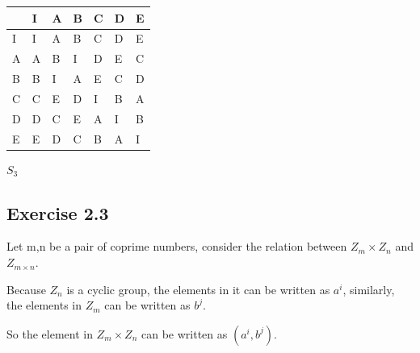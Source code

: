 \documentclass[]{ctexart}
\begin{document}
    \begin{center}
    	\begin{tabular}{l|llllll}
    		\cline{2-7}
    		& \multicolumn{1}{l|}{I} & \multicolumn{1}{l|}{A} & \multicolumn{1}{l|}{B} & \multicolumn{1}{l|}{C} & \multicolumn{1}{l|}{D} & \multicolumn{1}{l|}{E} \\ \hline
    		\multicolumn{1}{|l|}{I} & I                      & A                      & B                      & C                      & D                      & E                      \\ \cline{1-1}
    		\multicolumn{1}{|l|}{A} & A                      & B                      & I                      & D                      & E                      & C                      \\ \cline{1-1}
    		\multicolumn{1}{|l|}{B} & B                      & I                      & A                      & E                      & C                      & D                      \\ \cline{1-1}
    		\multicolumn{1}{|l|}{C} & C                      & E                      & D                      & I                      & B                      & A                      \\ \cline{1-1}
    		\multicolumn{1}{|l|}{D} & D                      & C                      & E                      & A                      & I                      & B                      \\ \cline{1-1}
    		\multicolumn{1}{|l|}{E} & E                      & D                      & C                      & B                      & A                      & I                      \\ \cline{1-1}
    	\end{tabular}
    	\centerline{$S_3$}
    \end{center}\textbf{}
 
    \subsection{Exercise 2.3}
    Let m,n be a pair of coprime numbers, consider the relation between $Z_m \times Z_n$ and $Z_{m\times n}$.
    
    Because $Z_n$ is a cyclic group, the elements in it can be written as $a^i$, similarly, the elements in $Z_m$ can be written as $b^j$.
    
    So the element in  $Z_m \times Z_n$ can be written as $(a^i,b^j)$. 
    
\end{document}
